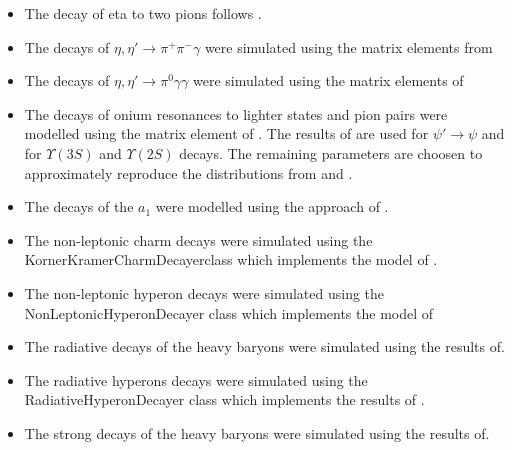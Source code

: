 \documentclass{article}
\begin{document}
\begin{itemize}
\item The decay of eta to two pions follows \cite{Beisert:2003zs,Gormley:1970qz,Tippens:2001fm}.
\item The decays of $\eta,\eta'\to\pi^+\pi^-\gamma$ were simulated using the matrix elements from \cite{Venugopal:1998fq,Holstein:2001bt}
\item The decays of $\eta,\eta'\to\pi^0\gamma\gamma$ were simulated using the matrix elements of \cite{Holstein:2001bt}
\item The decays of onium resonances to lighter states and pion pairs were modelled using the matrix element of \cite{Brown:1975dz}. The results of \cite{Bai:1999mj} are used for $\psi'\to\psi$ and \cite{Cronin-Hennessy:2007sj} for $\Upsilon(3S)$ and $\Upsilon(2S)$ decays. The remaining parameters are choosen to approximately reproduce the distributions from \cite{Aubert:2006bm} and \cite{Adam:2005mr}.
\item The decays of the $a_1$ were modelled using the approach of \cite{Kuhn:1990ad}.

\item The non-leptonic charm decays were simulated using the KornerKramerCharmDecayerclass which implements the model of \cite{Korner:1992wi}.
\item The non-leptonic hyperon decays were simulated using the NonLeptonicHyperonDecayer class which implements the model of\cite{Borasoy:1999md}
\item The radiative decays of the heavy baryons were simulated using the results of\cite{Ivanov:1999bk,Ivanov:1998wj}.
\item The radiative hyperons decays were simulated using the RadiativeHyperonDecayer class which implements the results of \cite{Borasoy:1999nt}.
\item The strong decays of the heavy baryons were simulated using the results of\cite{Ivanov:1999bk}.
\end{itemize}
\end{document}
